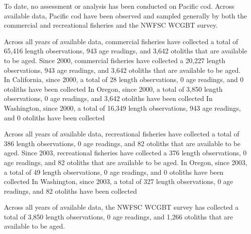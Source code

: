 \documentclass[11pt,
  english,
  letterpaper,
]{article}
\begin{document}
\leavevmode\tagmcend\tagstructend


To date, no assessment or analysis has been conducted on Pacific cod. Across available data, Pacific cod have been observed and sampled generally by both the commercial and recreational fisheries and the NWFSC WCGBT survey.

\leavevmode\tagmcend\tagstructend\par


Across all years of available data, commercial fisheries have collected a total of 65,416 length observations, 943 age readings, and 3,642 otoliths that are available to be aged. Since 2000, commercial fisheries have collected a 20,227 length observations, 943 age readings, and 3,642 otoliths that are available to be aged. In California, since 2000, a total of 28 length observations, 0 age readings, and 0 otoliths have been collected In Oregon, since 2000, a total of 3,850 length observations, 0 age readings, and 3,642 otoliths have been collected In Washington, since 2000, a total of 16,349 length observations, 943 age readings, and 0 otoliths have been collected

\leavevmode\tagmcend\tagstructend\par


Across all years of available data, recreational fisheries have collected a total of 386 length observations, 0 age readings, and 82 otoliths that are available to be aged. Since 2003, recreational fisheries have collected a 376 length observations, 0 age readings, and 82 otoliths that are available to be aged. In Oregon, since 2003, a total of 49 length observations, 0 age readings, and 0 otoliths have been collected In Washington, since 2003, a total of 327 length observations, 0 age readings, and 82 otoliths have been collected

\leavevmode\tagmcend\tagstructend\par


Across all years of available data, the NWFSC WCGBT survey has collected a total of 3,850 length observations, 0 age readings, and 1,266 otoliths that are available to be aged.

\leavevmode\tagmcend\tagstructend\par
\end{document}
